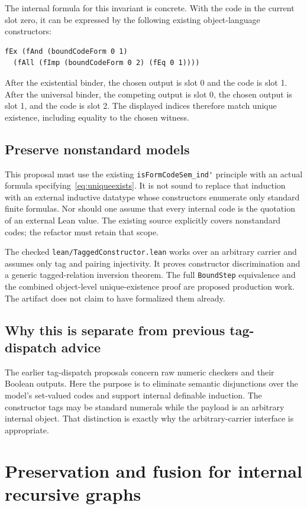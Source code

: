 \documentclass[11pt]{article}
\theoremstyle{remark}\newtheorem{remark}[theorem]{Remark}
\newcommand{\code}[1]{\nolinkurl{#1}}
\begin{document}
The internal formula for this invariant is concrete. With the code in the current slot zero, it can be expressed by the following existing object-language constructors:
\begin{lstlisting}
fEx (fAnd (boundCodeForm 0 1)
  (fAll (fImp (boundCodeForm 0 2) (fEq 0 1))))
\end{lstlisting}
After the existential binder, the chosen output is slot 0 and the code is slot 1. After the universal binder, the competing output is slot 0, the chosen output is slot 1, and the code is slot 2. The displayed indices therefore match unique existence, including equality to the chosen witness.

\subsection{Preserve nonstandard models}

This proposal must use the existing \code{isFormCodeSem_ind'} principle with an actual formula specifying~\eqref{eq:uniqueexists}. It is not sound to replace that induction with an external inductive datatype whose constructors enumerate only standard finite formulas. Nor should one assume that every internal code is the quotation of an external Lean value. The existing source explicitly covers nonstandard codes; the refactor must retain that scope.

The checked \code{lean/TaggedConstructor.lean} works over an arbitrary carrier and assumes only tag and pairing injectivity. It proves constructor discrimination and a generic tagged-relation inversion theorem. The full \code{BoundStep} equivalence and the combined object-level unique-existence proof are proposed production work. The artifact does not claim to have formalized them already.

\subsection{Why this is separate from previous tag-dispatch advice}

The earlier tag-dispatch proposals concern raw numeric checkers and their Boolean outputs. Here the purpose is to eliminate semantic disjunctions over the model's set-valued codes and support internal definable induction. The constructor tags may be standard numerals while the payload is an arbitrary internal object. That distinction is exactly why the arbitrary-carrier interface is appropriate.

\section{Preservation and fusion for internal recursive graphs}
\label{sec:iteration}
\end{document}
